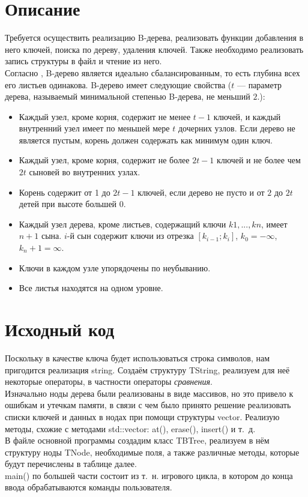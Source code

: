 \section{Описание}
Требуется осуществить реализацию B-дерева, реализовать функции добавления в него ключей, поиска по дереву, удаления ключей. Также необходимо реализовать запись структуры в файл и чтение из него.\\
Согласно \cite{b-tree-ifmo}, B-дерево является идеально сбалансированным, то есть глубина всех его листьев одинакова. B-дерево имеет следующие свойства ($t$ — параметр дерева, называемый минимальной степенью B-дерева, не меньший $2$.):
\begin{itemize}
	\item Каждый узел, кроме корня, содержит не менее $t-1$ ключей, и каждый внутренний узел имеет по меньшей мере $t$ дочерних узлов. Если дерево не является пустым, корень должен содержать как минимум один ключ. 
	\item Каждый узел, кроме корня, содержит не более $2t-1$ ключей и не более чем $2t$ сыновей во внутренних узлах.
	\item Корень содержит от 1 до $2t-1$ ключей, если дерево не пусто и от $2$ до $2t$ детей при высоте большей 0.
	\item Каждый узел дерева, кроме листьев, содержащий ключи $k1,...,kn$, имеет $n+1$ сына. $i$-й сын содержит ключи из отрезка $[k_{i-1};k_{i}]$, $k_0=-\infty$, $k_n+1=\infty$.
	\item Ключи в каждом узле упорядочены по неубыванию.
	\item Все листья находятся на одном уровне.
\end{itemize}

\pagebreak

\section{Исходный код}
Поскольку в качестве ключа будет использоваться строка символов, нам пригодится реализация string. Создаём структуру {\ttfamily TString}, реализуем для неё некоторые операторы, в частности операторы {\itshape сравнения}.\\
Изначально ноды дерева были реализованы в виде массивов, но это привело к ошибкам и утечкам памяти, в связи с чем было принято решение реализовать списки ключей и данных в нодах при помощи структуры {\ttfamily vector}. Реализую методы, схожие с методами {\ttfamily std::vector: at(), erase(), insert()} и т.\ д.\\
В файле основной программы создадим класс {\ttfamily TBTree}, реализуем в нём структуру ноды {\ttfamily TNode}, необходимые поля, а также различные методы, которые будут перечислены в таблице далее.\\
{\ttfamily main()} по большей части состоит из т.\ н. игрового цикла, в котором до конца ввода обрабатываются команды пользователя.

